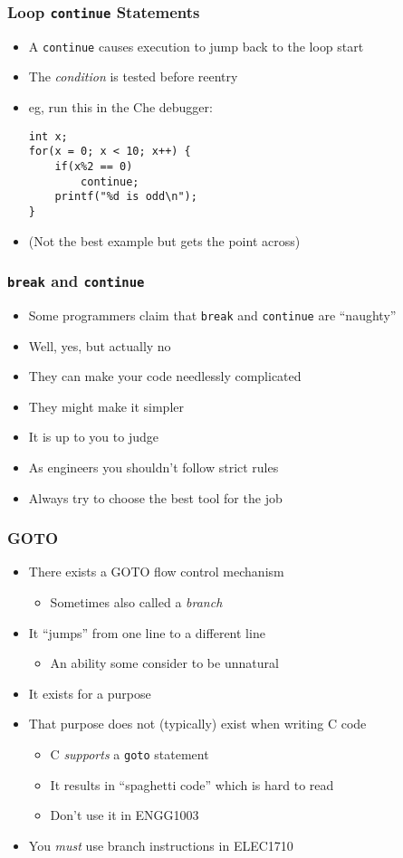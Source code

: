 \documentclass[14pt]{beamer}
\begin{document}
\begin{frame}[fragile]
\frametitle{Loop \texttt{continue} Statements}
\begin{itemize}
	\item A \texttt{continue} causes execution to jump back to the loop start
	\item The \textit{condition} is tested before reentry	
	\item eg, run this in the Che debugger:
	\begin{lstlisting}[style=CStyle]
int x;
for(x = 0; x < 10; x++) {
	if(x%2 == 0)
		continue;
	printf("%d is odd\n");
}
\end{lstlisting}
\item {\small(Not the best example but gets the point across)}
\end{itemize}
\end{frame}

\begin{frame}
\frametitle{\texttt{break} and \texttt{continue}}
\begin{itemize}
\item Some programmers claim that \texttt{break} and \texttt{continue} are ``naughty''
\item Well, yes, but actually no
\item They can make your code needlessly complicated
\item They might make it simpler
\item It is up to you to judge
\item As engineers you shouldn't follow strict rules
\item Always try to choose the best tool for the job
\end{itemize}
\end{frame}

\begin{frame}
\frametitle{GOTO}
\begin{itemize}
\item There exists a GOTO flow control mechanism
	\begin{itemize}
		\item Sometimes also called a \textit{branch}
	\end{itemize}
\item It ``jumps'' from one line to a different line
	\begin{itemize}
		\item An ability some consider to be unnatural
	\end{itemize}
\item It exists for a purpose
\item That purpose does not (typically) exist when writing C code
	\begin{itemize}
		\item C \textit{supports} a \texttt{goto} statement
		\item It results in ``spaghetti code'' which is hard to read
		\item Don't use it in ENGG1003
	\end{itemize}
\item You \textit{must} use branch instructions in ELEC1710
\end{itemize}
\end{frame}
\end{document}
